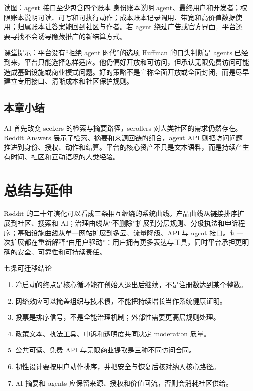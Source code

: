 \documentclass[a4paper]{article}
\begin{document}
\begin{knowledgebox}{读图：agent 接口至少包含四个账本}
身份账本说明 agent、最终用户和开发者；权限账本说明可读、可写和可执行动作；成本账本记录调用、带宽和高价值数据使用；归属账本让答案能回到社区与作者。若 agent 绕过广告或官方界面，平台还要寻找不会诱导隐藏推广的新结算方式。
\end{knowledgebox}

\begin{warningbox}{课堂提示：平台没有“拒绝 agent 时代”的选项}
Huffman 的口头判断是 agents 已经到来，平台只能选择怎样适应。他仍偏好开放和可访问，但承认无限免费访问可能造成基础设施或商业模式问题。好的策略不是宣称全面开放或全面封闭，而是尽早建立专用接口、清晰成本和社区保护规则。
\end{warningbox}

\subsection{本章小结}

AI 首先改变 seekers 的检索与摘要路径，scrollers 对人类社区的需求仍然存在。Reddit Answers 展示了检索、摘要和来源回链的组合，agent API 则把访问问题推进到身份、授权、动作和结算。平台的核心资产不只是文本语料，而是持续产生有时间、社区和互动语境的人类经验。

\section{总结与延伸}

Reddit 的二十年演化可以看成三条相互缠绕的系统曲线。产品曲线从链接排序扩展到社区、搜索和 AI；治理曲线从“不删除”扩展到分层规则、分级执法和申诉程序；基础设施曲线从单一网站扩展到多云、流量降级、API 与 agent 接口。每一次扩展都在重新解释“由用户驱动”：用户拥有更多表达与工具，同时平台承担更明确的安全、可靠性和可持续责任。

\begin{importantbox}{七条可迁移结论}
\begin{enumerate}
  \item 冷启动的终点是核心循环能在创始人退出后继续，不是注册数达到某个整数。
  \item 网络效应可以掩盖组织与技术债，不能把持续增长当作系统健康证明。
  \item 投票是排序信号，不是全能治理机制；外部性需要更高层规则处理。
  \item 政策文本、执法工具、申诉和透明度共同决定 moderation 质量。
  \item 公共可读、免费 API 与无限商业提取是三种不同访问合同。
  \item 韧性设计要按用户动作排序，并把安全与恢复后核对纳入核心路径。
  \item AI 摘要和 agents 应保留来源、授权和价值回流，否则会消耗社区供给。
\end{enumerate}
\end{importantbox}
\end{document}
